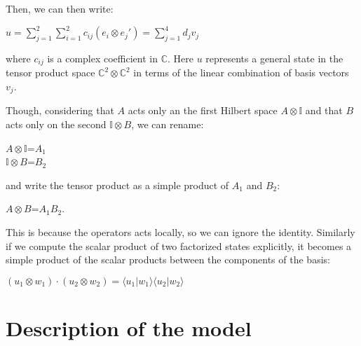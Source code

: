 \documentclass{Configuration_Files/PoliMi3i_thesis}
\begin{document}
Then, we can then write:

\begin{center}
  $u = \sum_{j=1}^{2} \sum_{i=1}^{2} c_{ij} (e_i \otimes e_j') = \sum_{j=1}^{4} d_j v_j$
\end{center}

where $c_{ij}$ is a complex coefficient in $\mathbb{C}$. Here $u$ represents a general state  in the tensor product space $\mathbb{C}^2 \otimes \mathbb{C}^2$ in terms of the linear combination of basis vectors $v_j$.


Though, considering that $A$ acts only an the first Hilbert space $A \otimes \mathbb{I}$ and that $B$ acts only on the second $\mathbb{I} \otimes B$, we can rename:

\begin{center}
	$A \otimes \mathbb{I}$=$A_1$ \\
	$\mathbb{I} \otimes B$=$B_2$
\end{center}

and write the tensor product as a simple product of $A_1$ and $B_2$:

\begin{center}
	$A \otimes B$=$A_1$$B_2$.
\end{center}

This is because the operators acts locally, so we can ignore the identity. \newline
Similarly if we compute the scalar product of two factorized states explicitly, it becomes a simple product of the scalar products between the components of the basis:

\begin{center}
	$(u_1 \otimes w_1) \cdot (u_2 \otimes w_2) = \langle u_1 | w_1 \rangle \langle u_2 | w_2 \rangle$
\end{center}








\newpage
\section{Description of the model}
\label{sec:Model}
\end{document}
